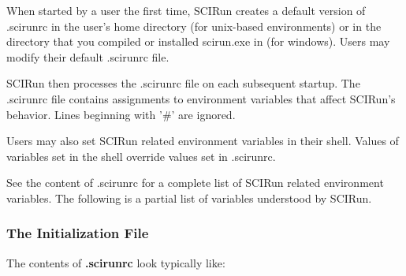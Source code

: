 \documentclass[fleqn,12pt,openany]{book}
\begin{document}
When started by a user the first time, SCIRun creates a default version of .scirunrc in the user's home directory (for unix-based environments) or in the directory that you compiled or installed scirun.exe in (for windows).
Users may modify their default .scirunrc file.

SCIRun then processes the .scirunrc file on each subsequent startup.
The .scirunrc file contains assignments to environment variables that affect SCIRun's behavior.
Lines beginning with '\#' are ignored.

Users may also set SCIRun related environment variables in their shell.
Values of variables set in the shell override values set in .scirunrc.

See the content of .scirunrc for a complete list of SCIRun related environment variables.
The following is a partial list of variables understood by SCIRun.

\subsubsection{The Initialization File}

The contents of \textbf{.scirunrc} look typically like:
\end{document}
